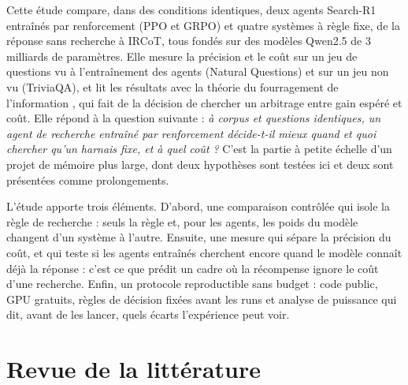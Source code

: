 Cette étude compare, dans des conditions identiques, deux agents Search-R1 entraînés par renforcement (PPO et GRPO) et quatre systèmes à règle fixe, de la réponse sans recherche à IRCoT, tous fondés sur des modèles Qwen2.5 de 3 milliards de paramètres. Elle mesure la précision et le coût sur un jeu de questions vu à l'entraînement des agents (Natural Questions) et sur un jeu non vu (TriviaQA), et lit les résultats avec la théorie du fourragement de l'information \citep{pirolli1999information}, qui fait de la décision de chercher un arbitrage entre gain espéré et coût. Elle répond à la question suivante : \emph{à corpus et questions identiques, un agent de recherche entraîné par renforcement décide-t-il mieux quand et quoi chercher qu'un harnais fixe, et à quel coût ?} C'est la partie à petite échelle d'un projet de mémoire plus large, dont deux hypothèses sont testées ici et deux sont présentées comme prolongements.

L'étude apporte trois éléments. D'abord, une comparaison contrôlée qui isole la règle de recherche : seuls la règle et, pour les agents, les poids du modèle changent d'un système à l'autre. Ensuite, une mesure qui sépare la précision du coût, et qui teste si les agents entraînés cherchent encore quand le modèle connaît déjà la réponse : c'est ce que prédit un cadre où la récompense ignore le coût d'une recherche. Enfin, un protocole reproductible sans budget : code public, GPU gratuits, règles de décision fixées avant les runs et analyse de puissance qui dit, avant de les lancer, quels écarts l'expérience peut voir.

\section{Revue de la littérature}\label{sec:revue}

